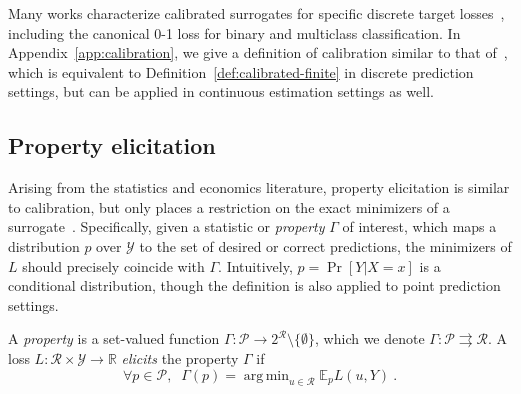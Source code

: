 \documentclass[anon,12pt]{colt2021} %
\newcommand{\Comments}{1}
\newcommand{\mytodo}[2]{\ifnum\Comments=1%
	\todo[linecolor=#1!80!black,backgroundcolor=#1,bordercolor=#1!80!black]{#2}\fi}
\newcommand{\jessiet}[1]{\mytodo{purple!20!white}{JF: #1}}
\newcommand{\reals}{\mathbb{R}}
\newcommand{\E}{\mathbb{E}}
\newcommand{\R}{\mathcal{R}}
\renewcommand{\P}{\mathcal{P}}
\newcommand{\Y}{\mathcal{Y}}
\newcommand{\exploss}[3]{\E_{#3} #1(#2,Y)}
\newcommand{\toto}{\rightrightarrows}
\DeclareMathOperator*{\argmin}{arg\,min}
\begin{document}
Many works characterize calibrated surrogates for specific discrete target losses~\citep{zhang2004statistical,lin2004note,bartlett2006convexity,tewari2007consistency}, including the canonical 0-1 loss for binary and multiclass classification.
In Appendix~\ref{app:calibration}, we give a definition of calibration similar to that of~\citet{steinwart2008support}, which is equivalent to Definition~\ref{def:calibrated-finite} in discrete prediction settings, but can be applied in continuous estimation settings as well.


\subsection{Property elicitation}\label{subsec:properties}
Arising from the statistics and economics literature, property elicitation is similar to calibration, but only places a restriction on the exact minimizers of a surrogate~\citep{savage1971elicitation,osband1985information-eliciting,lambert2008eliciting,lambert2009eliciting,lambert2018elicitation,frongillo2015vector-valued,frongillo2014general}.
Specifically, given a statistic or \emph{property} $\Gamma$ of interest, which maps a distribution $p$ over $\Y$ to the set of desired or correct predictions, the minimizers of $L$ should precisely coincide with $\Gamma$.
Intuitively, $p = \Pr[Y|X=x]$ is a conditional distribution, though the definition is also applied to point prediction settings.

\begin{definition}
	A \emph{property} is a set-valued function $\Gamma : \P \to 2^\R \setminus \{\emptyset\}$, which we denote $\Gamma: \P \toto \R$.
	A loss $L : \R \times \Y \to \reals$ \emph{elicits} the property $\Gamma$ if
	\begin{equation}
    \label{eq:elic}    
    \forall p \in \P, \;\; \Gamma(p) = \argmin_{u \in \R} \exploss{L}{u}{p}~.
	\end{equation}
\end{definition}
\end{document}
